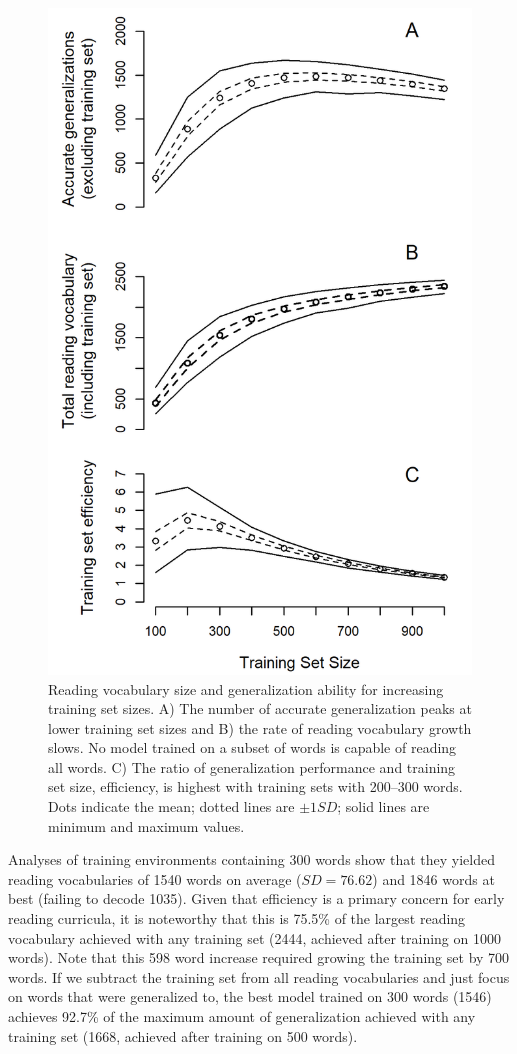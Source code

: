\documentclass[10pt,letterpaper]{article}
\begin{document}
\begin{figure}[t]
	\includegraphics[width=0.9\columnwidth]{figures/generalization_by_setsize.png}

	\caption{Reading vocabulary size and generalization ability for increasing training set sizes. A) The number of accurate generalization peaks at lower training set sizes and B) the rate of reading vocabulary growth slows. No model trained on a subset of words is capable of reading all words. C) The ratio of generalization performance and training set size, efficiency, is highest with training sets with 200--300 words. Dots indicate the mean; dotted lines are $\pm 1 SD$; solid lines are minimum and maximum values.}
	
	\label{gen_by_setsize}
\end{figure}

Analyses of training environments containing 300 words show that they yielded reading vocabularies of 1540 words on average ($SD = 76.62$) and 1846 words at best (failing to decode 1035). Given that efficiency is a primary concern for early reading curricula, it is noteworthy that this is 75.5\% of the largest reading vocabulary achieved with any training set (2444, achieved after training on 1000 words). Note that this 598 word increase required growing the training set by 700 words. If we subtract the training set from all reading vocabularies and just focus on words that were generalized to, the best model trained on 300 words (1546) achieves 92.7\% of the maximum amount of generalization achieved with any training set (1668, achieved after training on 500 words).
\end{document}

